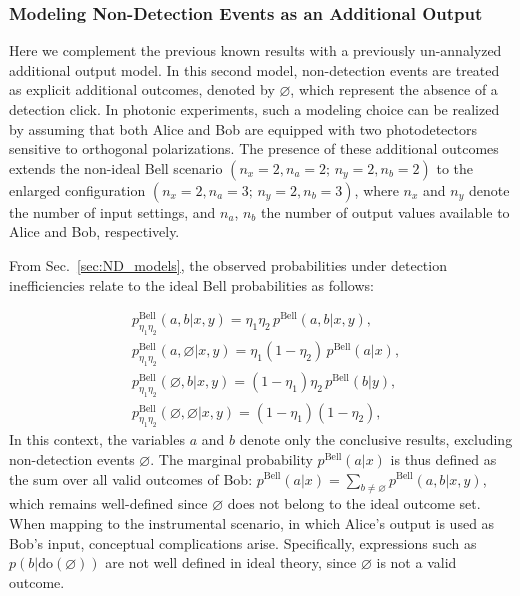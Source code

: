 \documentclass[aps,pra,reprint, superscriptaddress,showkeys]{revtex4-2}
\theoremstyle{plain}
\begin{document}
\subsubsection{Modeling Non-Detection Events as an Additional Output}

Here we complement the previous known results with a previously un-annalyzed additional output model. In this second model, non-detection events are treated as explicit additional outcomes, denoted by $\varnothing$, which represent the absence of a detection click. In photonic experiments, such a modeling choice can be realized by assuming that both Alice and Bob are equipped with two photodetectors sensitive to orthogonal polarizations. The presence of these additional outcomes extends the non-ideal Bell scenario $(n_x = 2, n_a = 2;\, n_y = 2, n_b = 2)$ to the enlarged configuration $(n_x = 2, n_a = 3;\, n_y = 2, n_b = 3)$, where $n_x$ and $n_y$ denote the number of input settings, and $n_a$, $n_b$ the number of output values available to Alice and Bob, respectively.

From Sec.~\ref{sec:ND_models}, the observed probabilities under detection inefficiencies relate to the ideal Bell probabilities as follows:

\begin{align}
&p^{\text{Bell}}_{\eta_1 \eta_2}(a, b | x, y) = \eta_1 \eta_2\, p^{\text{Bell}}(a, b | x, y), \nonumber \\
&p^{\text{Bell}}_{\eta_1 \eta_2}(a, \varnothing | x, y) = \eta_1(1 - \eta_2)\, p^{\text{Bell}}(a | x), \nonumber \\
&p^{\text{Bell}}_{\eta_1 \eta_2}(\varnothing, b | x, y) = (1 - \eta_1)\eta_2\, p^{\text{Bell}}(b | y), \nonumber \\
&p^{\text{Bell}}_{\eta_1 \eta_2}(\varnothing, \varnothing | x, y) = (1 - \eta_1)(1 - \eta_2), \label{eq:bell_model2}
\end{align}
In this context, the variables $a$ and $b$ denote only the conclusive results, excluding non-detection events $\varnothing$. The marginal probability $p^{\text{Bell}}(a | x)$ is thus defined as the sum over all valid outcomes of Bob: $p^{\text{Bell}}(a | x) = \sum_{b \neq \varnothing} p^{\text{Bell}}(a, b | x, y)$, which remains well-defined since $\varnothing$ does not belong to the ideal outcome set. When mapping to the instrumental scenario, in which Alice's output is used as Bob's input, conceptual complications arise. Specifically, expressions such as $p(b | \text{do}(\varnothing))$ are not well defined in ideal theory, since $\varnothing$ is not a valid outcome. 
\end{document}
